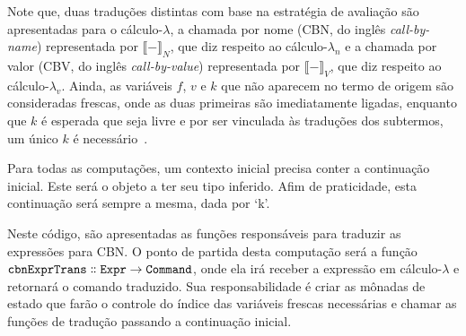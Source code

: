 \phantom{Newline}

\noindent Note que, duas traduções distintas com base na estratégia de avaliação são apresentadas para o cálculo-$\lambda$, a chamada por nome (CBN, do inglês \textit{call-by-name}) representada por ${\llbracket - \rrbracket}_N$, que diz respeito ao cálculo-${\lambda}_n$ e a chamada por valor (CBV, do inglês \textit{call-by-value}) representada por ${\llbracket - \rrbracket}_V$, que diz respeito ao cálculo-${\lambda}_v$.
Ainda, as variáveis $f$, $v$ e $k$ que não aparecem no termo de origem são consideradas frescas, onde as duas primeiras são imediatamente ligadas, enquanto que $k$ é esperada que seja livre e por ser vinculada às traduções dos subtermos, um único $k$ é necessário~\cite{torrens2024operational}.


Para todas as computações, um contexto inicial precisa conter a continuação inicial.
Este será o objeto a ter seu tipo inferido.
Afim de praticidade, esta continuação será sempre a mesma, dada por `k'.


Neste código, são apresentadas as funções responsáveis para traduzir as expressões para CBN.
O ponto de partida desta computação será a função $\mathtt{cbnExprTrans \dblcolon Expr \to Command}$, onde ela irá receber a expressão em cálculo-$\lambda$ e retornará o comando traduzido.
Sua responsabilidade é criar as mônadas de estado que farão o controle do índice das variáveis frescas necessárias e chamar as funções de tradução passando a continuação inicial.

